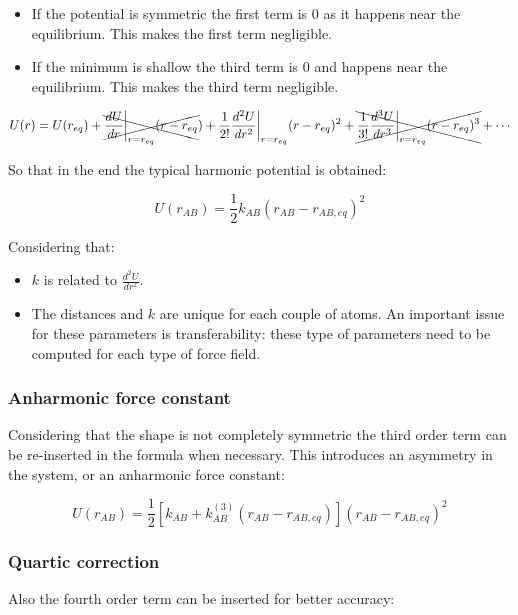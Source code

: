 	\begin{multicols}{2}
	  \begin{itemize}
	    \item If the potential is symmetric the first term is $0$ as it happens near the equilibrium.
				This makes the first term negligible.
			\item If the minimum is shallow the third term is $0$ and happens near the equilibrium.
				This makes the third term negligible.
	  \end{itemize}
	\end{multicols}

	\begin{align*}
		U(r)&=U(r_{eq}) + \xcancel{\frac{dU}{dr}\biggr\vert_{r=r_{eq}}(r-r_{eq}})+\frac{1}{2!}\frac{d^2U}{dr^2}\biggr\vert_{r=r_{eq}}(r-r_{eq})^2+\xcancel{\frac{1}{3!}\frac{d^3U}{dr^3}\biggr\vert_{r=r_{eq}}(r-r_{eq})^3}+\cdots\\
	\end{align*}

	So that in the end the typical harmonic potential is obtained:

	$$U(r_{AB}) = \frac{1}{2}k_{AB}(r_{AB}-r_{AB,eq})^2$$

	Considering that:

	\begin{multicols}{2}
	  \begin{itemize}
			\item $k$ is related to $\frac{d^2 U}{dr^2}$.
			\item The distances and $k$ are unique for each couple of atoms.
				An important issue for these parameters is transferability: these type of parameters need to be computed for each type of force field.
	  \end{itemize}
	\end{multicols}

		\subsubsection{Anharmonic force constant}
		Considering that the shape is not completely symmetric the third order term can be re-inserted in the formula when necessary.
		This introduces an asymmetry in the system, or an anharmonic force constant:

		$$U(r_{AB}) = \frac{1}{2}[k_{AB}+k^{(3)}_{AB}(r_{AB}-r_{AB, eq})](r_{AB}-r_{AB, eq})^2$$

		\subsubsection{Quartic correction}
		Also the fourth order term can be inserted for better accuracy:

